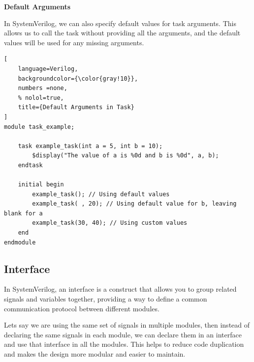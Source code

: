 \documentclass[12pt, a4paper]{article}
\begin{document}
\textbf{Default Arguments}

\vspace{0.5em}

In SystemVerilog, we can also specify default values for task arguments. This allows us to call the task without providing all the arguments, and the default values will be used for any missing arguments.

\begin{lstlisting}[
    language=Verilog,
    backgroundcolor={\color{gray!10}},
    numbers =none,
    % nolol=true,
    title={Default Arguments in Task}
]
module task_example;

    task example_task(int a = 5, int b = 10);
        $display("The value of a is %0d and b is %0d", a, b);
    endtask

    initial begin
        example_task(); // Using default values
        example_task( , 20); // Using default value for b, leaving blank for a
        example_task(30, 40); // Using custom values
    end
endmodule
\end{lstlisting}

\subsection{Interface}

In SystemVerilog, an interface is a construct that allows you to group related signals and variables together, providing a way to define a common communication protocol between different modules.

\vspace{0.3em}

Lets say we are using the same set of signals in multiple modules, then instead of declaring the same signals in each module, we can declare them in an interface and use that interface in all the modules. This helps to reduce code duplication and makes the design more modular and easier to maintain.
\end{document}
